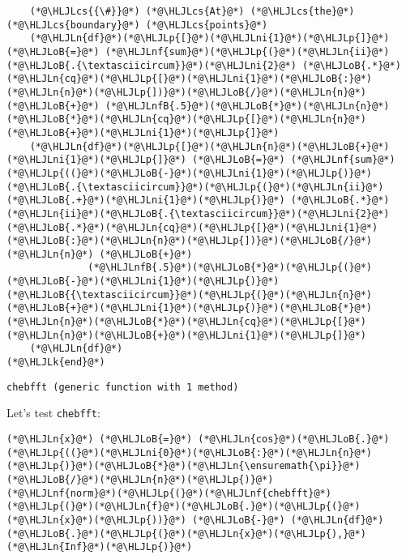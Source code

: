 \documentclass[12pt,a4paper]{article}
\newcommand{\HLJLk}[1]{\textcolor[RGB]{148,91,176}{\textbf{#1}}}
\newcommand{\HLJLn}[1]{#1}
\newcommand{\HLJLnf}[1]{\textcolor[RGB]{66,102,213}{#1}}
\newcommand{\HLJLnfB}[1]{\textcolor[RGB]{59,151,46}{#1}}
\newcommand{\HLJLni}[1]{\textcolor[RGB]{59,151,46}{#1}}
\newcommand{\HLJLoB}[1]{\textcolor[RGB]{102,102,102}{\textbf{#1}}}
\newcommand{\HLJLp}[1]{#1}
\newcommand{\HLJLcs}[1]{\textcolor[RGB]{153,153,119}{\textit{#1}}}
\begin{document}
\begin{lstlisting}
    (*@\HLJLcs{{\#}}@*) (*@\HLJLcs{At}@*) (*@\HLJLcs{the}@*) (*@\HLJLcs{boundary}@*) (*@\HLJLcs{points}@*)
    (*@\HLJLn{df}@*)(*@\HLJLp{[}@*)(*@\HLJLni{1}@*)(*@\HLJLp{]}@*) (*@\HLJLoB{=}@*) (*@\HLJLnf{sum}@*)(*@\HLJLp{(}@*)(*@\HLJLn{ii}@*)(*@\HLJLoB{.{\textasciicircum}}@*)(*@\HLJLni{2}@*) (*@\HLJLoB{.*}@*)(*@\HLJLn{cq}@*)(*@\HLJLp{[}@*)(*@\HLJLni{1}@*)(*@\HLJLoB{:}@*)(*@\HLJLn{n}@*)(*@\HLJLp{])}@*)(*@\HLJLoB{/}@*)(*@\HLJLn{n}@*) (*@\HLJLoB{+}@*) (*@\HLJLnfB{.5}@*)(*@\HLJLoB{*}@*)(*@\HLJLn{n}@*)(*@\HLJLoB{*}@*)(*@\HLJLn{cq}@*)(*@\HLJLp{[}@*)(*@\HLJLn{n}@*)(*@\HLJLoB{+}@*)(*@\HLJLni{1}@*)(*@\HLJLp{]}@*)     
    (*@\HLJLn{df}@*)(*@\HLJLp{[}@*)(*@\HLJLn{n}@*)(*@\HLJLoB{+}@*)(*@\HLJLni{1}@*)(*@\HLJLp{]}@*) (*@\HLJLoB{=}@*) (*@\HLJLnf{sum}@*)(*@\HLJLp{((}@*)(*@\HLJLoB{-}@*)(*@\HLJLni{1}@*)(*@\HLJLp{)}@*) (*@\HLJLoB{.{\textasciicircum}}@*)(*@\HLJLp{(}@*)(*@\HLJLn{ii}@*) (*@\HLJLoB{.+}@*)(*@\HLJLni{1}@*)(*@\HLJLp{)}@*) (*@\HLJLoB{.*}@*) (*@\HLJLn{ii}@*)(*@\HLJLoB{.{\textasciicircum}}@*)(*@\HLJLni{2}@*) (*@\HLJLoB{.*}@*)(*@\HLJLn{cq}@*)(*@\HLJLp{[}@*)(*@\HLJLni{1}@*)(*@\HLJLoB{:}@*)(*@\HLJLn{n}@*)(*@\HLJLp{])}@*)(*@\HLJLoB{/}@*)(*@\HLJLn{n}@*) (*@\HLJLoB{+}@*)
              (*@\HLJLnfB{.5}@*)(*@\HLJLoB{*}@*)(*@\HLJLp{(}@*)(*@\HLJLoB{-}@*)(*@\HLJLni{1}@*)(*@\HLJLp{)}@*)(*@\HLJLoB{{\textasciicircum}}@*)(*@\HLJLp{(}@*)(*@\HLJLn{n}@*)(*@\HLJLoB{+}@*)(*@\HLJLni{1}@*)(*@\HLJLp{)}@*)(*@\HLJLoB{*}@*)(*@\HLJLn{n}@*)(*@\HLJLoB{*}@*)(*@\HLJLn{cq}@*)(*@\HLJLp{[}@*)(*@\HLJLn{n}@*)(*@\HLJLoB{+}@*)(*@\HLJLni{1}@*)(*@\HLJLp{]}@*)
    (*@\HLJLn{df}@*)
(*@\HLJLk{end}@*)
\end{lstlisting}

\begin{lstlisting}
chebfft (generic function with 1 method)
\end{lstlisting}


Let's test \texttt{chebfft}:


\begin{lstlisting}
(*@\HLJLn{x}@*) (*@\HLJLoB{=}@*) (*@\HLJLn{cos}@*)(*@\HLJLoB{.}@*)(*@\HLJLp{((}@*)(*@\HLJLni{0}@*)(*@\HLJLoB{:}@*)(*@\HLJLn{n}@*)(*@\HLJLp{)}@*)(*@\HLJLoB{*}@*)(*@\HLJLn{\ensuremath{\pi}}@*)(*@\HLJLoB{/}@*)(*@\HLJLn{n}@*)(*@\HLJLp{)}@*)
(*@\HLJLnf{norm}@*)(*@\HLJLp{(}@*)(*@\HLJLnf{chebfft}@*)(*@\HLJLp{(}@*)(*@\HLJLn{f}@*)(*@\HLJLoB{.}@*)(*@\HLJLp{(}@*)(*@\HLJLn{x}@*)(*@\HLJLp{))}@*) (*@\HLJLoB{-}@*) (*@\HLJLn{df}@*)(*@\HLJLoB{.}@*)(*@\HLJLp{(}@*)(*@\HLJLn{x}@*)(*@\HLJLp{),}@*)(*@\HLJLn{Inf}@*)(*@\HLJLp{)}@*)
\end{lstlisting}
\end{document}
